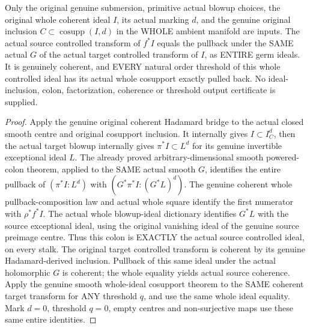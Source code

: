 \begin{theorem}
\label{hir:submersion-controlled-whole-ideal}
\leanok
{}
Only the original genuine submersion, primitive actual blowup choices,
the original whole coherent ideal $I$, its actual marking $d$, and the
genuine original inclusion $C\subset\operatorname{cosupp}(I,d)$ in the
WHOLE ambient manifold are inputs. The actual source controlled transform
of $f^*I$ equals the pullback under the SAME actual $G$ of the actual target
controlled transform of $I$, as ENTIRE germ ideals. It is genuinely coherent,
and EVERY natural order threshold of this whole controlled ideal has its
actual whole cosupport exactly pulled back. No ideal-inclusion, colon,
factorization, coherence or threshold output certificate is supplied.
\end{theorem}
\begin{proof}
Apply the genuine original coherent Hadamard bridge to the actual closed
smooth centre and original cosupport inclusion. It internally gives
$I\subset I_C^d$, then the actual target blowup internally gives
$\pi^*I\subset L^d$ for its genuine invertible exceptional ideal $L$.
The already proved arbitrary-dimensional smooth powered-colon theorem,
applied to the SAME actual smooth $G$, identifies the entire pullback of
$(\pi^*I:L^d)$ with $(G^*\pi^*I:(G^*L)^d)$. The genuine coherent whole
pullback-composition law and actual whole square identify the first
numerator with $\rho^*f^*I$. The actual whole blowup-ideal dictionary
identifies $G^*L$ with the source exceptional ideal, using the original
vanishing ideal of the genuine source preimage centre. Thus this colon
is EXACTLY the actual source controlled ideal, on every stalk.
The original target controlled transform is coherent by its genuine
Hadamard-derived inclusion. Pullback of this same ideal under the actual
holomorphic $G$ is coherent; the whole equality yields actual source
coherence. Apply the genuine smooth whole-ideal cosupport theorem to the
SAME coherent target transform for ANY threshold $q$, and use the same
whole ideal equality. Mark $d=0$, threshold $q=0$, empty centres and
non-surjective maps use these same entire identities.
\end{proof}

